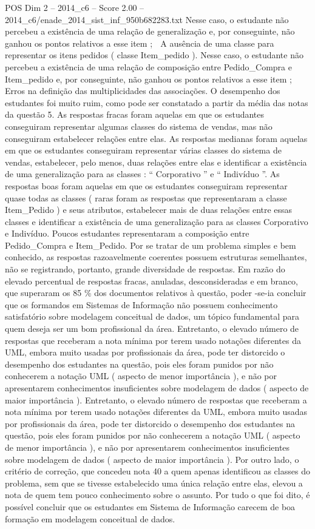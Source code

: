 \begin{textsample}{POS Dim 2 – 2014\_c6 – Score 2.00 – 2014\_c6/enade\_2014\_sist\_inf\_950b682283.txt}
Nesse caso, o estudante não percebeu a existência de uma relação de generalização e, por conseguinte, não ganhou os pontos relativos a esse item ;  A ausência de uma classe para representar os itens pedidos ( classe Item\_pedido ).
Nesse caso, o estudante não percebeu a existência de uma relação de composição entre Pedido\_Compra e Item\_pedido e, por conseguinte, não ganhou os pontos relativos a esse item ;  Erros na definição das multiplicidades das associações.
O desempenho dos estudantes foi muito ruim, como pode ser constatado a partir da média das notas da questão 5.
As respostas fracas foram aquelas em que os estudantes conseguiram representar algumas classes do sistema de vendas, mas não conseguiram estabelecer relações entre elas.
As respostas medianas foram aquelas em que os estudantes conseguiram representar várias classes do sistema de vendas, estabelecer, pelo menos, duas relações entre elas e identificar a existência de uma generalização para as classes : “ Corporativo ” e “ Indivíduo ”.
As respostas boas foram aquelas em que os estudantes conseguiram representar quase todas as classes ( raras foram as respostas que representaram a classe Item\_Pedido ) e seus atributos, estabelecer mais de duas relações entre essas classes e identificar a existência de uma generalização para as classes Corporativo e Indivíduo.
Poucos estudantes representaram a composição entre Pedido\_Compra e Item\_Pedido.
Por se tratar de um problema simples e bem conhecido, as respostas razoavelmente coerentes possuem estruturas semelhantes, não se registrando, portanto, grande diversidade de respostas.
Em razão do elevado percentual de respostas fracas, anuladas, desconsideradas e em branco, que superaram os 85 \% dos documentos relativos à questão, poder -se-ia concluir que os formandos em Sistemas de Informação não possuem conhecimento satisfatório sobre modelagem conceitual de dados, um tópico fundamental para quem deseja ser um bom profissional da área.
Entretanto, o elevado número de respostas que receberam a nota mínima por terem usado notações diferentes da UML, embora muito usadas por profissionais da área, pode ter distorcido o desempenho dos estudantes na questão, pois eles foram punidos por não conhecerem a notação UML ( aspecto de menor importância ), e não por apresentarem conhecimentos insuficientes sobre modelagem de dados ( aspecto de maior importância ).
Entretanto, o elevado número de respostas que receberam a nota mínima por terem usado notações diferentes da UML, embora muito usadas por profissionais da área, pode ter distorcido o desempenho dos estudantes na questão, pois eles foram punidos por não conhecerem a notação UML ( aspecto de menor importância ), e não por apresentarem conhecimentos insuficientes sobre modelagem de dados ( aspecto de maior importância ).
Por outro lado, o critério de correção, que concedeu nota 40 a quem apenas identificou as classes do problema, sem que se tivesse estabelecido uma única relação entre elas, elevou a nota de quem tem pouco conhecimento sobre o assunto.
Por tudo o que foi dito, é possível concluir que os estudantes em Sistema de Informação carecem de boa formação em modelagem conceitual de dados.


\end{textsample}
